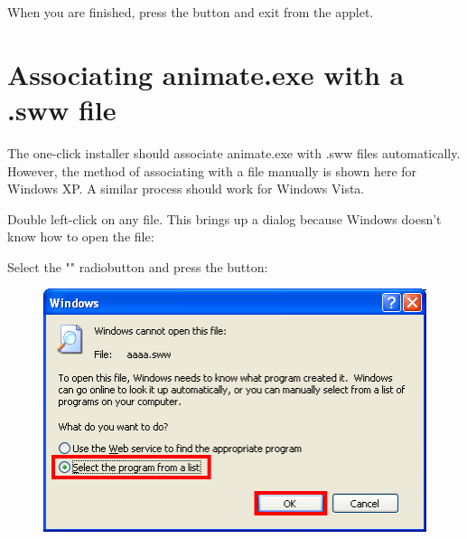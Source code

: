 \documentclass{manual}
\begin{document}
When you are finished, press the  button and exit from the applet.

\pagebreak

\section{Associating animate.exe with a .sww file}
\label{sec:assocanimatesww}

The one-click installer should associate animate.exe with .sww files automatically. However, the method of associating 
 with a  file manually is shown here for Windows XP.
A similar process should work for Windows Vista.

Double left-click on any  file.  This brings up a dialog because Windows doesn't know how to open the file:
\begin{figure}[ht]
  \centerline{}
  \label{fig:winassoc1}
\end{figure}

Select the "" radiobutton and press the  button:
\begin{figure}[ht]
  \centerline{\includegraphics[scale=0.5]{installgraphics/winassoc2.png}}
  \label{fig:winassoc2}
\end{figure}
\end{document}
